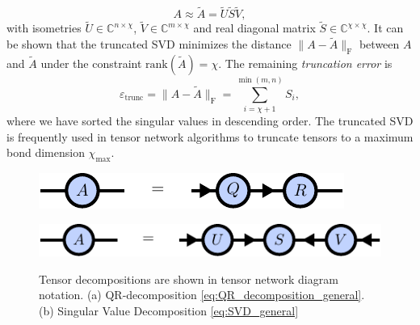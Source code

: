 \begin{equation}
	\label{eq:truncated_SVD_general}
	A \approx \tilde{A} = \tilde{U}\tilde{S}\tilde{V},
\end{equation}
with isometries $\tilde{U}\in\mathbb{C}^{n\times\chi}$, $\tilde{V}\in\mathbb{C}^{m\times\chi}$ and real diagonal matrix $\tilde{S}\in\mathbb{C}^{\chi\times\chi}$. It can be shown \cite{cite:eckart_young_theorem} that the truncated SVD minimizes the distance $\lVert A - \tilde{A} \rVert_\text{F}$ between $A$ and $\tilde{A}$ under the constraint $\text{rank}(\tilde{A}) = \chi$. The remaining \textit{truncation error} is
\begin{equation}
	\varepsilon_\text{trunc} = \lVert A - \tilde{A} \rVert_\text{F} = \sum_{i=\chi+1}^{\min(m,n)} S_i,
\end{equation} 
where we have sorted the singular values in descending order. The truncated SVD is frequently used in tensor network algorithms to truncate tensors to a maximum bond dimension $\chi_\text{max}$. \par
\begin{figure}
	\centering
	\begin{subfigure}[c]{0.1\textwidth}
		\caption{}\label{fig:tensor_decomposition_qr}
	\end{subfigure}%
	\begin{minipage}[c]{0.6\textwidth}
		\raisebox{-26pt}
		{%
			\includegraphics[scale=1]{figures/tikz/Tensor_Networks/tensor_decompositions/tensor_decompositions_a.pdf}
		}
	\end{minipage}
	\par\medskip
	\begin{subfigure}[c]{0.1\textwidth}
		\caption{}\label{fig:tensor_decomposition_svd}
	\end{subfigure}%
	\begin{minipage}[c]{0.6\textwidth}
		\raisebox{-26pt}
		{%
			\includegraphics[scale=1]{figures/tikz/Tensor_Networks/tensor_decompositions/tensor_decompositions_b.pdf}
		}
	\end{minipage}
	\caption{Tensor decompositions are shown in tensor network diagram notation. (a) QR-decomposition \eqref{eq:QR_decomposition_general}. (b) Singular Value Decomposition \eqref{eq:SVD_general}}
	\label{fig:tensor_decomposition_diagrams}
\end{figure}